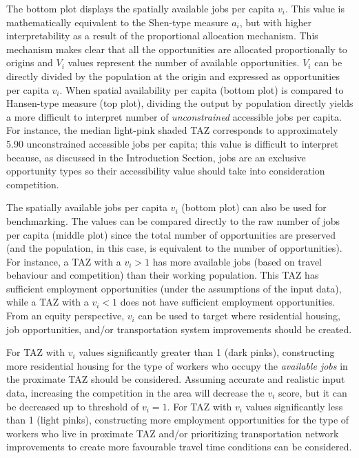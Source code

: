 \documentclass[10pt,letterpaper]{article}
\begin{document}
The bottom plot displays the spatially available jobs per capita
\(v_i\). This value is mathematically equivalent to the Shen-type
measure \(a_i\), but with higher interpretability as a result of the
proportional allocation mechanism. This mechanism makes clear that all
the opportunities are allocated proportionally to origins and \(V_i\)
values represent the number of available opportunities. \(V_i\) can be
directly divided by the population at the origin and expressed as
opportunities per capita \(v_i\). When spatial availability per capita
(bottom plot) is compared to Hansen-type measure (top plot), dividing
the output by population directly yields a more difficult to interpret
number of \emph{unconstrained} accessible jobs per capita. For instance,
the median light-pink shaded TAZ corresponds to approximately 5.90
unconstrained accessible jobs per capita; this value is difficult to
interpret because, as discussed in the Introduction Section, jobs are an
exclusive opportunity types so their accessibility value should take
into consideration competition.

The spatially available jobs per capita \(v_i\) (bottom plot) can also
be used for benchmarking. The values can be compared directly to the raw
number of jobs per capita (middle plot) since the total number of
opportunities are preserved (and the population, in this case, is
equivalent to the number of opportunities). For instance, a TAZ with a
\(v_i > 1\) has more available jobs (based on travel behaviour and
competition) than their working population. This TAZ has sufficient
employment opportunities (under the assumptions of the input data),
while a TAZ with a \(v_i < 1\) does not have sufficient employment
opportunities. From an equity perspective, \(v_i\) can be used to target
where residential housing, job opportunities, and/or transportation
system improvements should be created.

For TAZ with \(v_i\) values significantly greater than 1 (dark pinks),
constructing more residential housing for the type of workers who occupy
the \emph{available jobs} in the proximate TAZ should be considered.
Assuming accurate and realistic input data, increasing the competition
in the area will decrease the \(v_i\) score, but it can be decreased up
to threshold of \(v_i = 1\). For TAZ with \(v_i\) values significantly
less than 1 (light pinks), constructing more employment opportunities
for the type of workers who live in proximate TAZ and/or prioritizing
transportation network improvements to create more favourable travel
time conditions can be considered.
\end{document}
